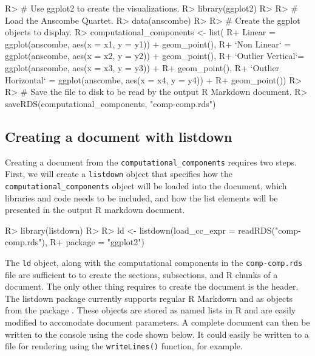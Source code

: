 \documentclass[
]{jss}
\begin{document}
\begin{CodeChunk}

\begin{CodeInput}
R> # Use ggplot2 to create the visualizations.
R> library(ggplot2)
R> 
R> # Load the Anscombe Quartet.
R> data(anscombe)
R> 
R> # Create the ggplot objects to display.
R>   computational_components <- list(
R+     Linear = ggplot(anscombe, aes(x = x1, y = y1)) + geom_point(),
R+     `Non Linear` = ggplot(anscombe, aes(x = x2, y = y2)) + geom_point(),
R+     `Outlier Vertical`= ggplot(anscombe, aes(x = x3, y = y3)) + 
R+       geom_point(),
R+     `Outlier Horizontal` =  ggplot(anscombe, aes(x = x4, y = y4)) + 
R+       geom_point())
R> 
R> # Save the file to disk to be read by the output R Markdown document.
R> saveRDS(computational_components, "comp-comp.rds")
\end{CodeInput}
\end{CodeChunk}

\hypertarget{creating-a-document-with-listdown}{%
\subsection{Creating a document with
listdown}\label{creating-a-document-with-listdown}}

Creating a document from the \texttt{computational\_components} requires
two steps. First, we will create a \texttt{listdown} object that
specifies how the \texttt{computational\_components} object will be
loaded into the document, which libraries and code needs to be included,
and how the list elements will be presented in the output R markdown
document.

\begin{CodeChunk}

\begin{CodeInput}
R> library(listdown)
R> 
R> ld <- listdown(load_cc_expr = readRDS("comp-comp.rds"),
R+                package = "ggplot2")
\end{CodeInput}
\end{CodeChunk}

The \texttt{ld} object, along with the computational components in the
\texttt{comp-comp.rds} file are sufficient to to create the sections,
subsections, and R chunks of a document. The only other thing requires
to create the document is the header. The listdown package currently
supports regular R Markdown and  as  objects
from the  package \citep{yaml}. These objects are stored as
named lists in R and are easily modified to accomodate document
parameters. A complete document can then be written to the console using
the code shown below. It could easily be written to a file for rendering
using the \texttt{writeLines()} function, for example.
\end{document}
